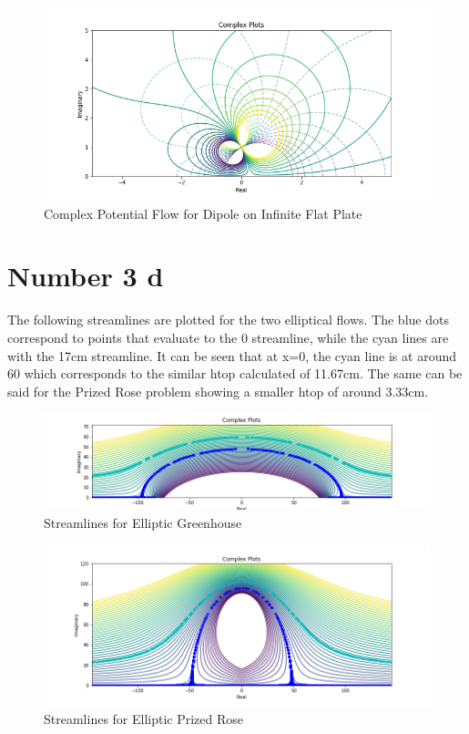 \documentclass{article}
\begin{document}
		\begin{figure}[H]
			\centering
			\includegraphics[width=1\textwidth]{images/second.png}
			\caption{ Complex Potential Flow for Dipole on Infinite Flat Plate}
		\end{figure}
		
	\section*{Number 3 d}
		The following streamlines are plotted for the two elliptical flows. The blue dots correspond to points that evaluate to the 0 streamline, while the cyan lines are with the 17cm streamline. It can be seen that at x=0, the cyan line is at around 60 which corresponds to the similar htop calculated of 11.67cm. The same can be said for the Prized Rose problem showing a smaller htop of around 3.33cm.
		
		\begin{figure}[H]
			\centering
			\includegraphics[width=1\textwidth]{images/third.png}
			\caption{ Streamlines for Elliptic Greenhouse}
		\end{figure}

		\begin{figure}[H]
			\centering
			\includegraphics[width=1\textwidth]{images/fourth.png}
			\caption{ Streamlines for Elliptic Prized Rose}
		\end{figure}
		
\end{document}
